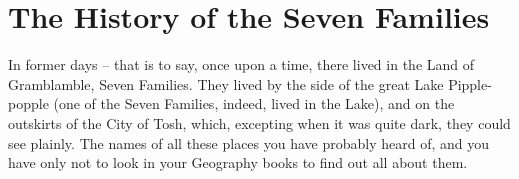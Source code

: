 \documentclass[11pt, a4paper]{article}%
\begin{document}
\section {The History of the Seven Families}%

           In former days – that is to say, once upon a time, there lived in the Land of Gramblamble, Seven Families. They lived by the side of the great Lake Pipple-popple (one of the Seven Families, indeed, lived in the Lake), and on the outskirts of the City of Tosh, which, excepting when it was quite dark, they could see plainly. The names of all these places you have probably heard of, and you have only not to look in your Geography books to find out all about them.
\end{document}
